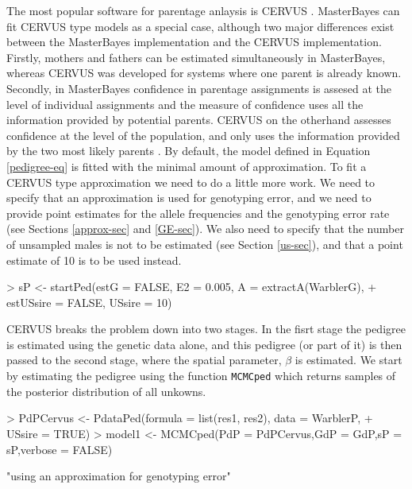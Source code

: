 \documentclass{article}
\begin{document}
The most popular software for parentage anlaysis is CERVUS \citep{Marshall.1998}.  MasterBayes can fit CERVUS type models as a special case, although two major differences exist between the MasterBayes implementation and the CERVUS implementation.  Firstly,  mothers and fathers can be estimated simultaneously in MasterBayes, whereas CERVUS was developed for systems where one parent is already known.  Secondly, in MasterBayes confidence in parentage assignments is assesed at the level of individual assignments and the measure of confidence uses all the information provided by potential parents.  CERVUS on the otherhand assesses confidence at the level of the population, and only uses the information provided by the two most likely parents \citep{Nielsen.2001}. By default, the model defined in Equation \ref{pedigree-eq} is fitted with the minimal amount of approximation.  To fit a CERVUS type approximation we need to do a little more work.  We need to specify that an approximation is used for genotyping error, and we need to provide point estimates for the allele frequencies and the genotyping error rate (see Sections \ref{approx-sec} and \ref{GE-sec}).  We also need to specify that the number of unsampled males is not to be estimated (see Section \ref{us-sec}), and that a point estimate of 10 is to be used instead. 

\begin{Schunk}
\begin{Sinput}
> sP <- startPed(estG = FALSE, E2 = 0.005, A = extractA(WarblerG), 
+     estUSsire = FALSE, USsire = 10)
\end{Sinput}
\end{Schunk}


CERVUS breaks the problem down into two stages.  In the fisrt stage the pedigree is estimated using the genetic data alone, and this pedigree (or part of it) is then passed to the second stage, where the spatial parameter, $\beta$ is estimated.  We start by estimating the pedigree using the function \texttt{MCMCped} which returns samples of the posterior distribution of all unkowns.

\begin{Schunk}
\begin{Sinput}
> PdPCervus <- PdataPed(formula = list(res1, res2), data = WarblerP, 
+     USsire = TRUE)
> model1 <- MCMCped(PdP = PdPCervus,GdP = GdP,sP = sP,verbose = FALSE)
\end{Sinput}
\begin{Soutput}
[1] "using an approximation for genotyping error"
\end{Soutput}
\end{Schunk}
\end{document}
